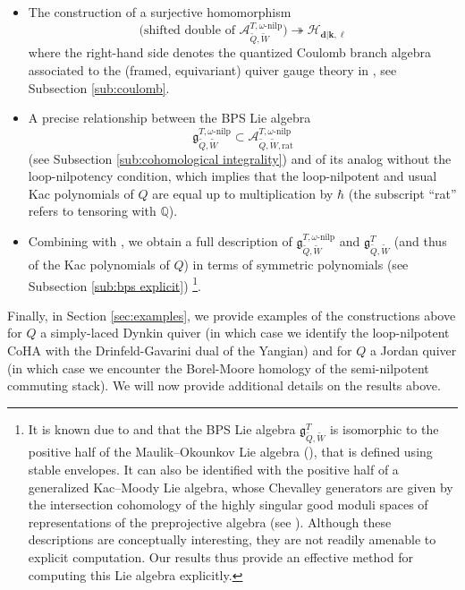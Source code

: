\documentclass{amsart}
\def\BQ{{\mathbb{Q}}}
\def\CH{{\mathcal{H}}}
\def\bd{{\mathbf{d}}}
\def\bk{{\mathbf{k}}}
\def\bell{\boldsymbol{\ell}}
\def\tQ{\tilde{Q}}
\def\tW{\tilde{W}}
\def\kha{\mathcal{A}^{T,\omega\text{-nilp}}_{\tQ,\tW}}
\def\kharat{\mathcal{A}^{T,\omega\text{-nilp}}_{\tQ,\tW,\text{rat}}}
\def\tbpsw{\mathfrak{g}^{T,\omega\text{-nilp}}_{\tilde{Q},\tilde{W}}}
\def\tbps{\mathfrak{g}^T_{\tilde{Q},\tilde{W}}}
\begin{document}
\begin{itemize}[leftmargin=*]
\medskip 

\item The construction of a surjective homomorphism 
$$
\Big(\text{shifted double of }\kha \Big) \twoheadrightarrow \CH_{\bd|\bk,\bell}
$$
where the right-hand side denotes the quantized Coulomb branch algebra associated to the (framed, equivariant) quiver gauge theory in \cite{BFN}, see Subsection \ref{sub:coulomb}.

\medskip 

\item A precise relationship between the BPS Lie algebra
$$
\tbpsw \subset \kharat
$$
(see Subsection \ref{sub:cohomological integrality}) and of its analog without the loop-nilpotency condition, which implies that the loop-nilpotent and usual Kac polynomials of $Q$ are equal up to multiplication by $\hbar$ (the subscript ``rat'' refers to tensoring with $\BQ$).

\medskip 

\item Combining with \cite{jindalnegutbps}, we obtain a full description of $\tbpsw$ and $\tbps$ (and thus of the Kac polynomials of $Q$) in terms of symmetric polynomials (see Subsection \ref{sub:bps explicit}) \footnote{It is known due to \cite{botta2023okounkovs} and \cite{schiffmann2024cohomologicalhallalgebrasquivers} that the BPS Lie algebra $\tbps$ is isomorphic to the positive half of the Maulik–Okounkov Lie algebra (\cite{moyangian}), that is defined using stable envelopes. It can also be identified with the positive half of a generalized Kac–Moody Lie algebra, whose Chevalley generators are given by the intersection cohomology of the highly singular good moduli spaces of representations of the preprojective algebra (see \cite{DHS}). Although these descriptions are conceptually interesting, they are not readily amenable to explicit computation. Our results thus provide an effective method for computing this Lie algebra explicitly.}.

\end{itemize}

\medskip 

\noindent Finally, in Section \ref{sec:examples}, we provide examples of the constructions above for $Q$ a simply-laced Dynkin quiver (in which case we identify the loop-nilpotent CoHA with the Drinfeld-Gavarini dual of the Yangian) and for $Q$ a Jordan quiver (in which case we encounter the Borel-Moore homology of the semi-nilpotent commuting stack). We will now provide additional details on the results above.
\end{document}
